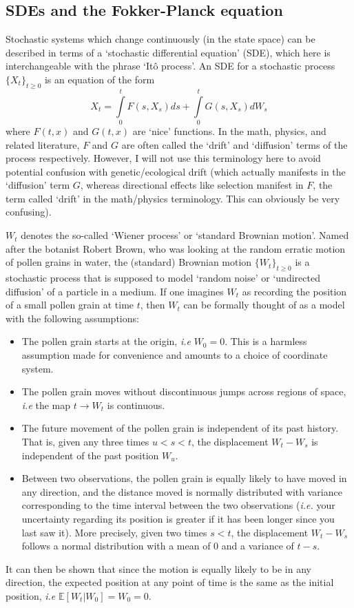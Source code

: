 \subsection{SDEs and the Fokker-Planck equation}\label{intro_SDE}
Stochastic systems which change continuously (in the state space) can be described in terms of a `stochastic differential equation' (SDE), which here is interchangeable with the phrase `It\^o process'. An SDE for a stochastic process $\{X_t\}_{t \geq 0}$ is an equation of the form
\begin{equation}
\label{ito_SDE_integral}
X_t = \int\limits_{0}^{t} F(s,X_s)ds + \int\limits_{0}^{t} G(s,X_s)dW_s
\end{equation}
where $F(t,x)$ and $G(t,x)$ are `nice' functions. In the math, physics, and related literature, $F$ and $G$ are often called the `drift' and `diffusion' terms of the process respectively. However, I will not use this terminology here to avoid potential confusion with genetic/ecological drift (which actually manifests in the `diffusion' term $G$, whereas directional effects like selection manifest in $F$, the term called `drift' in the math/physics terminology. This can obviously be very confusing).

$W_t$ denotes the so-called `Wiener process' or `standard Brownian motion'. Named after the botanist Robert Brown, who was looking at the random erratic motion of pollen grains in water, the (standard) Brownian motion $\{W_t\}_{t \geq 0}$ is a stochastic process that is supposed to model `random noise' or `undirected diffusion' of a particle in a medium. If one imagines $W_t$ as recording the position of a small pollen grain at time $t$, then $W_t$ can be formally thought of as a model with the following assumptions:
\begin{itemize}
	\item The pollen grain starts at the origin, \emph{i.e} $W_0 = 0$. This is a harmless assumption made for convenience and amounts to a choice of coordinate system.
	\item The pollen grain moves without discontinuous jumps across regions of space, \emph{i.e} the map $t \to W_t$ is continuous.
	\item The future movement of the pollen grain is independent of its past history. That is, given any three times $u < s < t$, the displacement $W_t - W_s$ is independent of the past position $W_u$.
	\item Between two observations, the pollen grain is equally likely to have moved in any direction, and the distance moved is normally distributed with variance corresponding to the time interval between the two observations (\emph{i.e.} your uncertainty regarding its position is greater if it has been longer since you last saw it). More precisely, given two times $s < t$, the displacement $W_t - W_s$ follows a normal distribution with a mean of $0$  and a variance of $t-s$.
\end{itemize}
It can then be shown that since the motion is equally likely to be in any direction, the expected position at any point of time is the same as the initial position, \emph{i.e} $\mathbb{E}[W_t | W_0] = W_0 = 0$.

